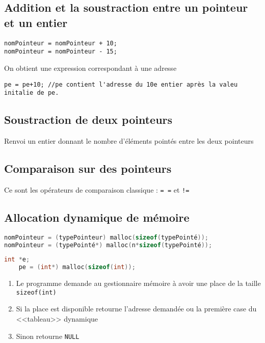 \subsection{Addition et la soustraction entre un pointeur et un entier}
\begin{verbatim}
nomPointeur = nomPointeur + 10; 
nomPointeur = nomPointeur - 15; 
\end{verbatim}
On obtient une expression correspondant à une adresse
\begin{verbatim}
pe = pe+10; //pe contient l'adresse du 10e entier après la valeu initalie de pe.
\end{verbatim}

\subsection{Soustraction de deux pointeurs}
Renvoi un entier donnant le nombre d'éléments pointés entre les deux pointeurs

\subsection{Comparaison sur des pointeurs}
Ce sont les opérateurs de comparaison classique : \texttt{= =} et \texttt{!=}

\subsection{Allocation dynamique de mémoire}
\begin{lstlisting}[language=C, numbers=none,frame=none]
nomPointeur = (typePointeur) malloc(sizeof(typePointé));
nomPointeur = (typePointé*) malloc(n*sizeof(typePointé));
\end{lstlisting}
\begin{lstlisting}[language=C, numbers=none,frame=none]
	int *e;
	pe = (int*) malloc(sizeof(int));
\end{lstlisting}
\begin{enumerate}
	\item Le programme demande au gestionnaire mémoire à avoir une place de la taille \texttt{sizeof(int)}
	\item Si la place est disponible retourne l'adresse demandée ou la première case du <<tableau>> dynamique
	\item Sinon retourne \texttt{NULL}
\end{enumerate}

